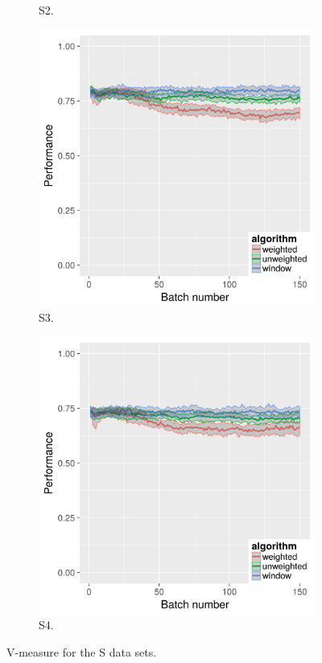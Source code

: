 \begin{figure}[h]
\begin{subfigure}{.45\textwidth}
  \caption{S2.}
\end{subfigure}
\begin{subfigure}{.45\textwidth}
  \centering
  \includegraphics[width=.9\linewidth]{s_set/s_set_3_with_weighted_ci_one_size_vmeasure.png}
  \caption{S3.}
\end{subfigure}%
\begin{subfigure}{.45\textwidth}
  \centering
  \includegraphics[width=.9\linewidth]{s_set/s_set_4_with_weighted_ci_one_size_vmeasure.png}
  \caption{S4.}
\end{subfigure}
\caption{V-measure for the S data sets.}
\label{fig:s_set_vmeasure}
\end{figure}

